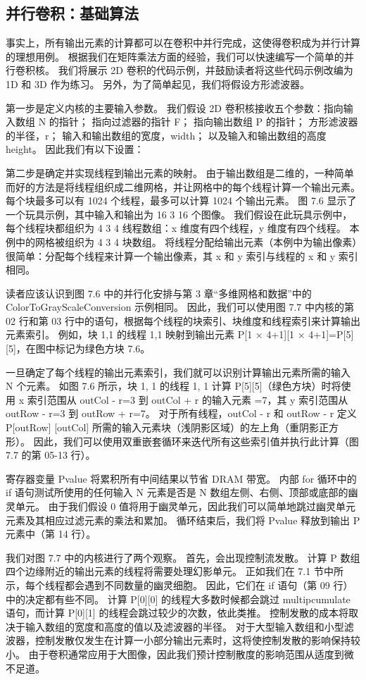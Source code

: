 \subsection{并行卷积：基础算法}
事实上，所有输出元素的计算都可以在卷积中并行完成，这使得卷积成为并行计算的理想用例。 根据我们在矩阵乘法方面的经验，我们可以快速编写一个简单的并行卷积核。 我们将展示 2D 卷积的代码示例，并鼓励读者将这些代码示例改编为 1D 和 3D 作为练习。 另外，为了简单起见，我们将假设方形滤波器。

第一步是定义内核的主要输入参数。 我们假设 2D 卷积核接收五个参数：指向输入数组 N 的指针； 指向过滤器的指针 F； 指向输出数组 P 的指针； 方形滤波器的半径，r； 输入和输出数组的宽度，width； 以及输入和输出数组的高度 height。 因此我们有以下设置：

第二步是确定并实现线程到输出元素的映射。 由于输出数组是二维的，一种简单而好的方法是将线程组织成二维网格，并让网格中的每个线程计算一个输出元素。 每个块最多可以有 1024 个线程，最多可以计算 1024 个输出元素。 图 7.6 显示了一个玩具示例，其中输入和输出为 16 3 16 个图像。 我们假设在此玩具示例中，每个线程块都组织为 4 3 4 线程数组：x 维度有四个线程，y 维度有四个线程。 本例中的网格被组织为 4 3 4 块数组。 将线程分配给输出元素（本例中为输出像素）很简单：分配每个线程来计算一个输出像素，其 x 和 y 索引与线程的 x 和 y 索引相同。

读者应该认识到图 7.6 中的并行化安排与第 3 章“多维网格和数据”中的 ColorToGrayScaleConversion 示例相同。 因此，我们可以使用图 7.7 中内核的第 02 行和第 03 行中的语句，根据每个线程的块索引、块维度和线程索引来计算输出元素索引。 例如，块 1,1 的线程 1,1 映射到输出元素 P[1 × 4+1][1 × 4+1]=P[5][5]，在图中标记为绿色方块 7.6。

一旦确定了每个线程的输出元素索引，我们就可以识别计算输出元素所需的输入 N 个元素。 如图 7.6 所示，块 1, 1 的线程 1, 1 计算 P[5][5]（绿色方块）时将使用 x 索引范围从 outCol - r=3 到 outCol + r 的输入元素 =7，其 y 索引范围从 outRow - r=3 到 outRow + r=7。 对于所有线程，outCol - r 和 outRow - r 定义 P[outRow] [outCol] 所需的输入元素块（浅阴影区域）的左上角（重阴影正方形）。 因此，我们可以使用双重嵌套循环来迭代所有这些索引值并执行此计算（图 7.7 的第 05-13 行）。

寄存器变量 Pvalue 将累积所有中间结果以节省 DRAM 带宽。 内部 for 循环中的 if 语句测试所使用的任何输入 N 元素是否是 N 数组左侧、右侧、顶部或底部的幽灵单元。 由于我们假设 0 值将用于幽灵单元，因此我们可以简单地跳过幽灵单元元素及其相应过滤元素的乘法和累加。 循环结束后，我们将 Pvalue 释放到输出 P 元素中（第 14 行）。

我们对图 7.7 中的内核进行了两个观察。 首先，会出现控制流发散。 计算 P 数组四个边缘附近的输出元素的线程将需要处理幻影单元。 正如我们在 7.1 节中所示，每个线程都会遇到不同数量的幽灵细胞。 因此，它们在 if 语句（第 09 行）中的决定都有些不同。 计算 P[0][0] 的线程大多数时候都会跳过 multipcumulate 语句，而计算 P[0][1] 的线程会跳过较少的次数，依此类推。 控制发散的成本将取决于输入数组的宽度和高度的值以及滤波器的半径。 对于大型输入数组和小型滤波器，控制发散仅发生在计算一小部分输出元素时，这将使控制发散的影响保持较小。 由于卷积通常应用于大图像，因此我们预计控制散度的影响范围从适度到微不足道。

